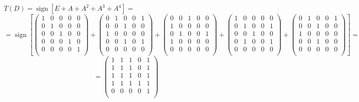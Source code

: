 \documentclass[fleqn]{article}
\DeclareMathOperator{\sign}{sign}
\begin{document}
$T(D)= \sign{[E + A + A^2 + A^3 + A^4]}=$
$$=\sign\left[\begin{pmatrix}
1 & 0 & 0 & 0 & 0\\
0 & 1 & 0 & 0 & 0\\
0 & 0 & 1 & 0 & 0\\
0 & 0 & 0 & 1 & 0\\
0 & 0 & 0 & 0 & 1\\
\end{pmatrix}
+
\begin{pmatrix}
0 & 1 & 0 & 0 & 1 \\
0 & 0 & 1 & 0 & 0 \\
1 & 0 & 0 & 0 & 0 \\
0 & 0 & 1 & 0 & 1 \\
0 & 0 & 0 & 0 & 0 \\
\end{pmatrix}
+
\begin{pmatrix}
0 & 0 & 1 & 0 & 0 \\
1 & 0 & 0 & 0 & 0 \\
0 & 1 & 0 & 0 & 1 \\
1 & 0 & 0 & 0 & 0 \\
0 & 0 & 0 & 0 & 0 \\
\end{pmatrix}
+
\begin{pmatrix}
1 & 0 & 0 & 0 & 0 \\
0 & 1 & 0 & 0 & 1 \\
0 & 0 & 1 & 0 & 0 \\
0 & 1 & 0 & 0 & 1 \\
0 & 0 & 0 & 0 & 0 \\
\end{pmatrix}
+
\begin{pmatrix}
0 & 1 & 0 & 0 & 1 \\
0 & 0 & 1 & 0 & 0 \\
1 & 0 & 0 & 0 & 0 \\
0 & 0 & 1 & 0 & 0 \\
0 & 0 & 0 & 0 & 0 \\
\end{pmatrix}\right]
=$$
$$=\begin{pmatrix}
1 & 1 & 1 & 0 & 1\\
1 & 1 & 1 & 0 & 1\\
1 & 1 & 1 & 0 & 1\\
1 & 1 & 1 & 1 & 1\\
0 & 0 & 0 & 0 & 1\\
\end{pmatrix}
$$
\end{document}

